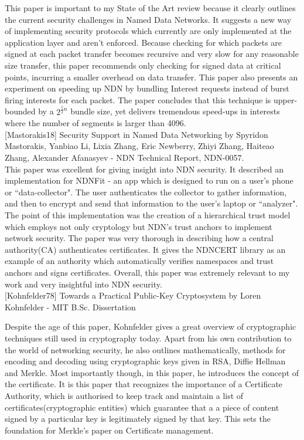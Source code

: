 This paper is important to my State of the Art review because it clearly outlines the current security challenges in Named Data Networks. It suggests a new way of implementing security protocols which currently are only implemented at the application layer and aren’t enforced. Because checking for which packets are signed at each packet transfer becomes recursive and very slow for any reasonable size transfer, this paper recommends only checking for signed data at critical points, incurring a smaller overhead on data transfer. This paper also presents an experiment on speeding up NDN by bundling Interest requests instead of burst firing interests for each packet. The paper concludes that this technique is upper-bounded by a $2^{\frac{1}{2}n}$ bundle size, yet delivers tremendous speed-ups in interests where the number of segments is larger than 4096.\\


[Mastorakis18] Security Support in Named Data Networking by Spyridon Mastorakis, Yanbiao Li, Lixia Zhang, Eric Newberry, Zhiyi Zhang, Haiteao Zhang, Alexander Afanasyev - NDN Technical Report, NDN-0057.\\

This paper was excellent for giving insight into NDN security. It described an implementation for NDNFit - an app which is designed to run on a user's phone or ``data-collector". The user authenticates the collector to gather information, and then to encrypt and send that information to the user's laptop or ``analyzer". The point of this implementation was the creation of a hierarchical trust model which employs not only cryptology but NDN's trust anchors to implement network security. The paper was very thorough in describing how a central authority(CA) authenticates certificates. It gives the NDNCERT library as an example of an authority which automatically verifies namespaces and trust anchors and signs certificates. Overall, this paper was extremely relevant to my work and very insightful into NDN security.\\

[Kohnfelder78] Towards a Practical Public-Key Cryptosystem by Loren Kohnfelder - MIT B.Sc. Dissertation

Despite the age of this paper, Kohnfelder gives a great overview of cryptographic techniques still used in cryptography today. Apart from his own contribution to the world of networking security, he also outlines mathematically, methods for encoding and decoding using cryptographic keys given in RSA, Diffie Hellman and Merkle. Most importantly though, in this paper, he introduces the concept of the certificate. It is this paper that recognizes the importance of a Certificate Authority, which is authorised to keep track and maintain a list of certificates(cryptographic entities) which guarantee that a a piece of content signed by a particular key is legitimately signed by that key. This sets the foundation for Merkle's paper on Certificate management.\\


